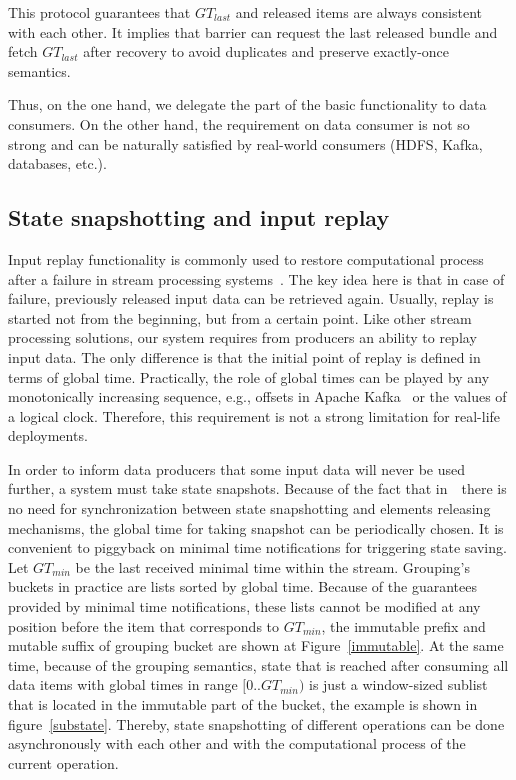 This protocol guarantees that $GT_{last}$ and released items are always consistent with each other. It implies that barrier can request the last released bundle and fetch $GT_{last}$ after recovery to avoid duplicates and preserve exactly-once semantics.

Thus, on the one hand, we delegate the part of the basic functionality to data consumers. On the other hand, the requirement on data consumer is not so strong and can be naturally satisfied by real-world consumers (HDFS, Kafka, databases, etc.). 


\subsection{State snapshotting and input replay}

Input replay functionality is commonly used to restore computational process after a failure in stream processing systems~\cite{Carbone:2017:SMA:3137765.3137777, Akidau:2013:MFS:2536222.2536229, apache:storm}. The key idea here is that in case of failure, previously released input data can be retrieved again. Usually, replay is started not from the beginning, but from a certain point. Like other stream processing solutions, our system requires from producers an ability to replay input data. The only difference is that the initial point of replay is defined in terms of global time. Practically, the role of global times can be played by any monotonically increasing sequence, e.g., offsets in Apache Kafka~\cite{kreps2011kafka} or the values of a logical clock. Therefore, this requirement is not a strong limitation for real-life deployments.

In order to inform data producers that some input data will never be used further, a system must take state snapshots. Because of the fact that in~\FlameStream\ there is no need for synchronization between state snapshotting and elements releasing mechanisms, the global time for taking snapshot can be periodically chosen. It is convenient to piggyback on minimal time notifications for triggering state saving. Let $GT_{min}$ be the last received minimal time within the stream. Grouping's buckets in practice are lists sorted by global time. Because of the guarantees provided by minimal time notifications, these lists cannot be modified at any position before the item that corresponds to $GT_{min}$, the immutable prefix and mutable suffix of grouping bucket are shown at Figure~\ref{immutable}. At the same time, because of the grouping semantics, state that is reached after consuming all data items with global times in range $[0..GT_{min})$ is just a window-sized sublist that is located in the immutable part of the bucket, the example is shown in figure~\ref{substate}. Thereby, state snapshotting of different operations can be done asynchronously with each other and with the computational process of the current operation. 


